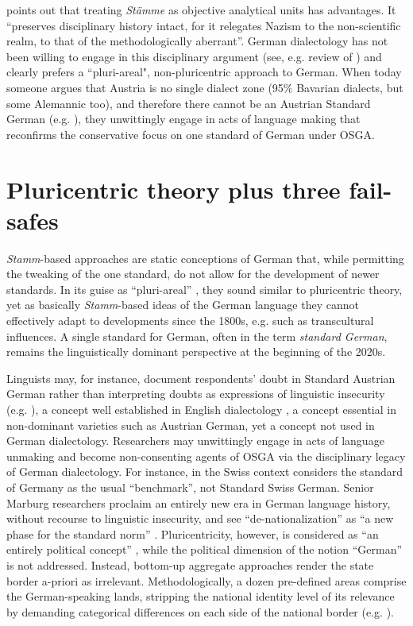 \documentclass[output=paper]{langscibook}
\begin{document}
\citet[78]{Hutton1999} points out that treating \textit{Stämme} as objective analytical units has advantages. It “preserves disciplinary history intact, for it relegates Nazism to the non-scientific realm, to that of the methodologically aberrant”. German dialectology has not been willing to engage in this disciplinary argument (see, e.g.  review of \citealt{Dollinger2019c}) and clearly prefers a ``pluri-areal", non-pluricentric approach to German. When today someone argues that Austria is no single dialect zone (95\% Bavarian dialects, but some Alemannic too), and therefore there cannot be an Austrian Standard German (e.g. \citealt[50]{ElspaßNiehaus2014,Herrgen2015,Elspaß2020}), they unwittingly engage in acts of language making that reconfirms the conservative focus on one standard of German under OSGA.

\section{Pluricentric theory plus three fail-safes}
\label{sec:dollinger:3}
\textit{Stamm}-based approaches are static conceptions of German that, while permitting the tweaking of the one standard, do not allow for the development of newer standards. In its guise as “pluri-areal” \citep{ElspaßEtAl2017}, they sound similar to pluricentric theory, yet as basically \textit{Stamm}-based ideas of the German language they cannot effectively adapt to developments since the 1800s, e.g. such as transcultural influences. A single standard for German, often in the term \textit{standard German}, remains the linguistically dominant perspective at the beginning of the 2020s.

Linguists may, for instance, document respondents’ doubt in Standard Austrian German rather than interpreting doubts as expressions of linguistic insecurity (e.g. \citealt{KoppensteinerLenz2020}), a concept well established in English dialectology \citep{Preston2013}, a concept essential in non-dominant varieties such as Austrian German, yet a concept not used in German dialectology. Researchers may unwittingly engage in acts of language unmaking and become non-con\-sent\-ing agents of OSGA via the disciplinary legacy of German dialectology. For instance, in the Swiss context \citet[60]{Dürscheid2009} considers the standard of Germany as the usual ``benchmark”, not Standard Swiss German. Senior Marburg researchers proclaim an entirely new era in German language history, without recourse to linguistic insecurity, and see “de-nationalization” as “a new phase for the standard norm” \citep[156]{Herrgen2015}. Pluricentricity, however, is considered as “an entirely political concept” \citep[50]{ElspaßNiehaus2014}, while the political dimension of the notion “German” is not addressed. Instead, bottom-up aggregate approaches render the state border a-priori as irrelevant. Methodologically, a dozen pre-defined areas comprise the German-speaking lands, stripping the national identity level of its relevance by demanding categorical differences on each side of the national border (e.g. \citealt[52]{Elspaß2020}).
\end{document}
